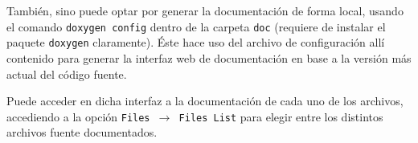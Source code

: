 \documentclass[a4paper]{article}
\begin{document}
También, sino puede optar por generar la documentación de forma local, usando el comando \texttt{doxygen config} dentro de la carpeta \texttt{doc} (requiere de instalar el paquete \texttt{doxygen} claramente). Éste hace uso del archivo de configuración allí contenido para generar la interfaz web de documentación en base a la versión más actual del código fuente.

Puede acceder en dicha interfaz a la documentación de cada uno de los archivos, accediendo a la opción \texttt{Files $\rightarrow$ Files List} para elegir entre los distintos archivos fuente documentados.

{}

\end{document}
